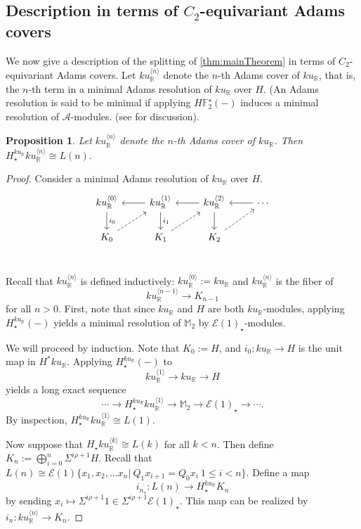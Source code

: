 \documentclass{amsart}
\newtheorem{proposition}[equation]{Proposition}
\theoremstyle{plain}
\numberwithin{equation}{section}
\numberwithin{figure}{section}
\newcommand{\mF}{{\mathbb F}}
\newcommand{\mM}{{\mathbb M}}
\newcommand{\mR}{{\mathbb R}}
\newcommand{\cA}{{\mathcal A}}
\newcommand{\cE}{{\mathcal E}}
\newcommand{\0}{\langle 0 \rangle }
\begin{document}
\subsection{Description in terms of $C_2$-equivariant Adams covers}\label{sec:adams covers}
We now give a description of the splitting  of \cref{thm:mainTheorem} in terms of $C_2$-equivariant Adams covers. Let $ku_{\mR}^{\langle n \rangle}$ denote the $n$-th Adams cover of $ku_{\mR}$, that is, the $n$-th term in a minimal Adams resolution of $ku_{\mR}$ over $H$. (An Adams resolution is said to be minimal if applying $H\mF_{2}^{\star}(-)$ induces a minimal resolution of $\cA$-modules. (see \cite[p.2-3]{lellmann1984operations} for discussion). 
\begin{proposition}
    Let $ku_{\mR}^{\langle n \rangle}$ denote the $n$-th Adams cover of $ku_{\mR}$. Then $H_{\star}^{ku_{\mR}}ku_{\mR}^{\langle n \rangle} \cong L(n)$.
\end{proposition}
\begin{proof}
    Consider a minimal Adams resolution of $ku_{\mR}$ over $H$. 
    \[
    \begin{tikzcd}
        ku_{\mR}^{\langle 0 \rangle }\arrow[d, "i_{0}"] & ku_{\mR}^{\langle 1 \rangle }\arrow[l]\arrow[d, "i_{1}"] & ku_{\mR}^{\langle 2 \rangle}\arrow[d]\arrow[l] & \cdots \arrow[l]\\
        K_{0}\arrow[ur, dashed] & K_{1}\arrow[ur, dashed]  & K_{2}\arrow[ur, dashed] \\
    \end{tikzcd}
    \]

Recall that $ku_{\mR}^{\langle n \rangle}$ is defined inductively: $ku_{\mR}^{\langle 0 \rangle}:= ku_{\mR}$ and $ku_{\mR}^{\langle n \rangle}$ is the fiber of 
\[
ku_{\mR}^{\langle n-1 \rangle} \to K_{n-1}
\]
for all $n>0$. First, note that since $ku_{\mR}$ and $H$ are both $ku_{\mR}$-modules, applying $H_{\star}^{ku_{\mR}}(-)$ yields a minimal resolution of $\mM_{2}$ by $\cE(1)_{\star}$-modules. 

We will proceed by induction. Note that $K_{0} := H$, and $i_{0}: ku_{\mR} \to H$ is the unit map in $H^{*}ku_{\mR}$. 
Applying $H_{\star}^{ku_{\mR}}(-)$ to 
\[ ku_{\mR}^{\langle 1 \rangle} \to ku_{\mR} \to H\] yields a long exact sequence
\[\cdots \to H_{\star}^{ku_{\mR}}ku_{\mR}^{\langle 1 \rangle} \to \mM_{2} \to \cE(1)_{\star} \to \cdots.  \]
By inspection, $H_{\star}^{ku_{\mR}}ku_{\mR}^{\langle 1 \rangle} \cong L(1)$. 

Now suppose that $H_{\star}ku_{\mR}^{\langle k \rangle} \cong L(k)$ for all $k < n$. Then define $K_{n}:= \bigoplus\limits_{i=0}^{n}\Sigma^{i \rho + 1} H$. Recall that $L(n) \cong \cE(1)\{x_{1}, x_{2}, \ldots x_{n}|\ Q_{1}x_{i+1} = Q_{0}x_{i}\ 1 \le i < n \}$. Define a map 
\[i_{n_{\star}}: L(n) \to H_{\star}^{ku_{\mR}} K_{n}\] 
by sending $x_{i} \mapsto \Sigma^{i \rho + 1}1 \in \Sigma^{i \rho + 1}\cE(1)_{\star}$. This map can be realized by $i_{n}:ku_{\mR}^{\langle n \rangle} \to  K_{n}$.
\end{proof}
\end{document}
